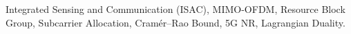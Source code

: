 \begin{abstract}
This is test for abstract.
It is automatic generated by ChatGPT, and it is not the final version.
\end{abstract}

\begin{IEEEkeywords}
Integrated Sensing and Communication (ISAC), MIMO-OFDM, Resource Block Group, Subcarrier Allocation, Cram\'{e}r--Rao Bound, 5G NR, Lagrangian Duality.
\end{IEEEkeywords}
